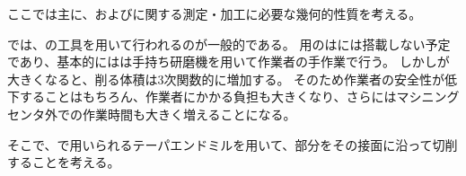 

ここでは主に、\textbf{\EndFaceOutRChamfer}および\textbf{\EndFaceInRChamfer}に関する測定・加工に必要な幾何的性質を考える。

\EndFaceRChamferMilling では、\BallendMill の工具を用いて行われるのが一般的である。
\EndFaceChamferMilling 用の\BallendMill は\DMC には搭載しない予定であり、基本的には\EndFaceRChamfer は手持ち研磨機を用いて作業者の手作業で行う。
しかし\EndFaceChamferLength が大きくなると、削る体積は3次関数的に増加する。
そのため作業者の安全性が低下することはもちろん、作業者にかかる負担も大きくなり、さらにはマシニングセンタ外での作業時間も大きく増えることになる。

そこで、\EndFaceCChamferMilling で用いられるテーパエンドミルを用いて、\EndFaceRChamfer 部分をその接面に沿って切削することを考える。



